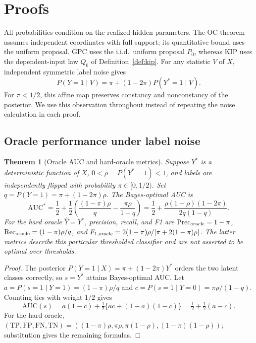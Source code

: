 \documentclass{article} %
\theoremstyle{plain}
\newtheorem{theorem}{Theorem}[section]
\theoremstyle{definition}
\theoremstyle{remark}
\begin{document}
\section{Proofs}
\label{appendix:proof_theorems}

All probabilities condition on the realized hidden parameters. The OC theorem
assumes independent coordinates with full support; its quantitative bound uses
the uniform proposal. GPC uses the i.i.d.\ uniform proposal $P_0$, whereas KIP
uses the dependent-input law $Q_0$ of Definition~\ref{def:kip}.
For any statistic $V$ of $X$, independent symmetric label noise gives
\begin{equation}
\label{eq:appendix_noise_channel}
P(Y=1\mid V)=\pi+(1-2\pi)P(Y^*=1\mid V).
\end{equation}
For $\pi<1/2$, this affine map preserves constancy and nonconstancy of the
posterior. We use this observation throughout instead of repeating the
noise calculation in each proof.

\subsection{Oracle performance under label noise}

\begin{theorem}[Oracle AUC and hard-oracle metrics]
\label{thm:optimal_performance}
Suppose $Y^*$ is a deterministic function of $X$, $0<\rho=P(Y^*=1)<1$,
and labels are independently flipped with probability $\pi\in[0,1/2)$.
Set $q=P(Y=1)=\pi+(1-2\pi)\rho$. The Bayes-optimal AUC is
\begin{equation}
\label{eq:oracle_auc_compact}
\mathrm{AUC}^*
=\frac12+\frac12\left(\frac{(1-\pi)\rho}{q}
-\frac{\pi\rho}{1-q}\right)
=\frac12+\frac{\rho(1-\rho)(1-2\pi)}{2q(1-q)}.
\end{equation}
For the hard oracle $\widehat Y=Y^*$, precision, recall, and F1 are
$\mathrm{Prec}_{\rm oracle}=1-\pi$,
$\mathrm{Rec}_{\rm oracle}=(1-\pi)\rho/q$, and
$F_{1,\rm oracle}=2(1-\pi)\rho/[\pi+2(1-\pi)\rho]$.
The latter metrics describe this particular thresholded classifier and are
not asserted to be optimal over thresholds.
\end{theorem}

\begin{proof}
\label{proof:optimal_performance}
The posterior $P(Y=1\mid X)=\pi+(1-2\pi)Y^*$ orders the two latent
classes correctly, so $s=Y^*$ attains Bayes-optimal AUC. Let
$a=P(s=1\mid Y=1)=(1-\pi)\rho/q$ and
$c=P(s=1\mid Y=0)=\pi\rho/(1-q)$. Counting ties with weight $1/2$ gives
\[
\mathrm{AUC}(s)=a(1-c)+\tfrac12\{ac+(1-a)(1-c)\}
=\tfrac12+\tfrac12(a-c).
\]
For the hard oracle, $(\mathrm{TP},\mathrm{FP},\mathrm{FN},\mathrm{TN})
=((1-\pi)\rho,\pi\rho,\pi(1-\rho),(1-\pi)(1-\rho))$;
substitution gives the remaining formulas.
\end{proof}
\end{document}
